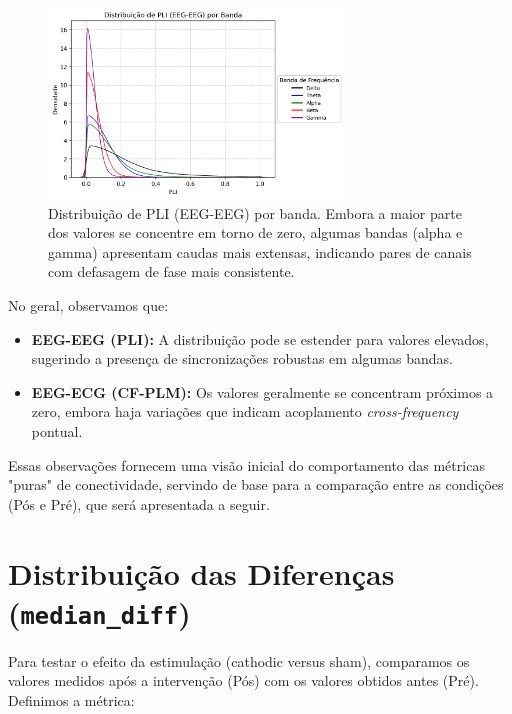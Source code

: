 \begin{figure}[htb]
    \centering
    \includegraphics[width=0.7\textwidth]{figs/3_1_connectivity_metrics/Distribuição_de_PLI_(EEG-EEG)_por_Banda.png}
    \caption{Distribuição de PLI (EEG-EEG) por banda. Embora a maior parte dos valores se concentre em torno de zero, algumas bandas (alpha e gamma) apresentam caudas mais extensas, indicando pares de canais com defasagem de fase mais consistente.}
    \label{fig:pli_eeg_eeg}
\end{figure}

No geral, observamos que:
\begin{itemize}
    \item \textbf{EEG-EEG (PLI):} A distribuição pode se estender para valores elevados, sugerindo a presença de sincronizações robustas em algumas bandas.
    \item \textbf{EEG-ECG (CF-PLM):} Os valores geralmente se concentram próximos a zero, embora haja variações que indicam acoplamento \emph{cross-frequency} pontual.
\end{itemize}

Essas observações fornecem uma visão inicial do comportamento das métricas "puras" de conectividade, servindo de base para a comparação entre as condições (Pós e Pré), que será apresentada a seguir.

\section{Distribuição das Diferenças (\texttt{median\_diff})}

Para testar o efeito da estimulação (cathodic versus sham), comparamos os valores medidos após a intervenção (Pós) com os valores obtidos antes (Pré). Definimos a métrica:

